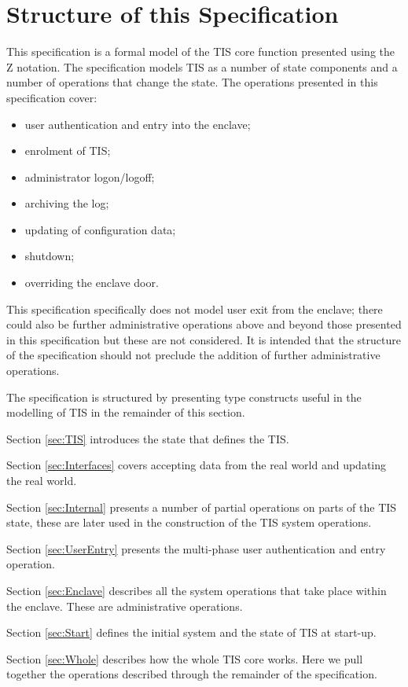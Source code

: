 \section{Structure of this Specification}
This specification is a formal model of the TIS core function
presented using the Z notation. 
The specification models TIS as a number of state components and a number of
operations that change the state.  The operations presented in this
specification cover:
\begin{itemize}
\item
user authentication and entry into the enclave;
\item
enrolment of TIS;
\item
administrator logon/logoff;
\item
archiving the log;
\item
updating of configuration data;
\item
shutdown;
\item
overriding the enclave door.
\end{itemize}
This specification specifically does not model user exit from the
enclave; there could also be further administrative operations above
and beyond those presented in this specification but
these are not considered. It is intended that the structure of the
specification should not preclude the addition of further administrative
operations. 

The specification is structured by presenting type constructs useful in the
modelling of TIS in the remainder of this section. 

Section \ref{sec:TIS} introduces the state that defines the TIS.
 
Section \ref{sec:Interfaces} covers accepting data
from the real world and updating the real world. 

Section \ref{sec:Internal} presents a number of partial operations on parts of
the TIS state, these are later used in the construction of the TIS
system operations. 

Section \ref{sec:UserEntry} presents the multi-phase user authentication and
entry operation.

Section \ref{sec:Enclave} describes all the system operations that
take place within the enclave. These are administrative operations.

Section \ref{sec:Start} defines the initial system and the state of TIS at
start-up.

Section \ref{sec:Whole} describes how the whole TIS core
works. Here we pull together the operations described through the remainder
of the specification.

